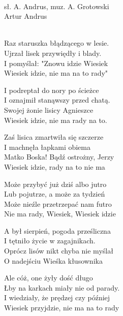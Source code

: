 \\
{sł. A. Andrus, muz. A. Grotowski}\\
{Artur Andrus}\\
\begin{text}\\
Raz staruszka błądzącego w lesie.\\
Ujrzał lisek przywiędły i blady.\\
I pomyślał: "Znowu idzie Wiesiek\\
Wiesiek idzie, nie ma na to rady"

I podreptał do nory po ścieżce\\
I oznajmił stanąwszy przed chatą.\\
Swojej żonie lisicy Agnieszce\\
Wiesiek idzie, nie ma rady na to.

Zaś lisica zmartwiła się szczerze\\
I machnęła łapkami obiema\\
Matko Boska! Bądź ostrożny, Jerzy\\
Wiesiek idzie, rady na to nie ma

Może przybyć już dziś albo jutro\\
Lub pojutrze, a może za tydzień\\
Może nieźle przetrzepać nam futro\\
Nie ma rady, Wiesiek, Wiesiek idzie

A był sierpień, pogoda prześliczna\\
I tętniło życie w zagajnikach.\\
Oprócz lisów nikt chyba nie myślał\\
O nadejściu Wieśka kłusownika

Ale cóż, one żyły dość długo\\
Łby na karkach miały nie od parady.\\
I wiedziały, że prędzej czy później\\
Wiesiek przyjdzie, nie ma na to rady
\end{text}
\begin{chord}
\end{chord}